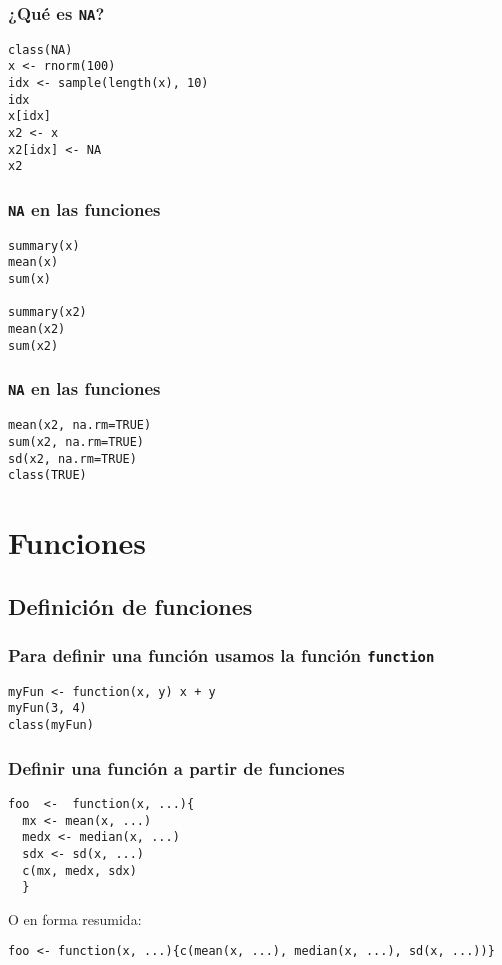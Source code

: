 \documentclass[xcolor={usenames,svgnames,dvipsnames}]{beamer}
\begin{document}
   
\begin{frame}[fragile]
\frametitle{¿Qué es \texttt{NA}?}
\label{sec-2-3-1}


\lstset{language=R}
\begin{lstlisting}
class(NA)
x <- rnorm(100)
idx <- sample(length(x), 10)
idx
x[idx]
x2 <- x
x2[idx] <- NA
x2
\end{lstlisting}
\end{frame}
\begin{frame}[fragile]
\frametitle{\texttt{NA} en las funciones}
\label{sec-2-3-2}



\lstset{language=R}
\begin{lstlisting}
summary(x)
mean(x)
sum(x)

summary(x2)
mean(x2)
sum(x2)
\end{lstlisting}
\end{frame}
\begin{frame}[fragile]
\frametitle{\texttt{NA} en las funciones}
\label{sec-2-3-3}



\lstset{language=R}
\begin{lstlisting}
mean(x2, na.rm=TRUE)
sum(x2, na.rm=TRUE)
sd(x2, na.rm=TRUE)
class(TRUE)
\end{lstlisting}
\end{frame}
\section{Funciones}
\label{sec-3}
\subsection{Definición de funciones}
\label{sec-3-1}
\begin{frame}[fragile]
\frametitle{Para definir una función usamos la función \texttt{function}}
\label{sec-3-1-1}


\lstset{language=R}
\begin{lstlisting}
myFun <- function(x, y) x + y
myFun(3, 4)
class(myFun)
\end{lstlisting}
\end{frame}
\begin{frame}[fragile]
\frametitle{Definir una función a partir de funciones}
\label{sec-3-1-2}


\lstset{language=R}
\begin{lstlisting}
foo  <-  function(x, ...){
  mx <- mean(x, ...)
  medx <- median(x, ...)
  sdx <- sd(x, ...)
  c(mx, medx, sdx)
  }
\end{lstlisting}
O en forma resumida:

\lstset{language=R}
\begin{lstlisting}
foo <- function(x, ...){c(mean(x, ...), median(x, ...), sd(x, ...))}
\end{lstlisting}
\end{frame}
\end{document}
